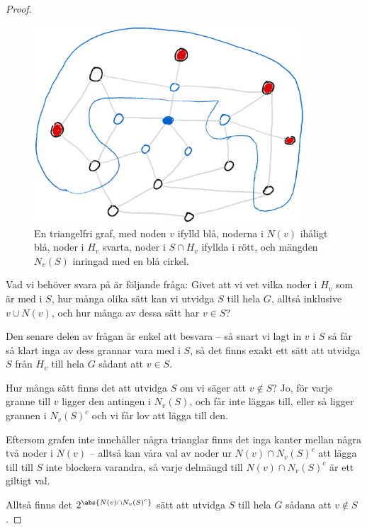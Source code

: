 \documentclass[nobib]{tufte-handout}
\begin{document}
\begin{lemma}
\begin{proof}
    \begin{figure}
      \centering
      \includegraphics[width=0.9\textwidth]{graphics/independent_sets_in_triangle_free_graphs.png}
      \caption{En triangelfri graf, med noden $v$ ifylld blå, noderna i $N(v)$ ihåligt blå, noder i $H_v$ svarta, noder i $S \cap H_v$ ifyllda i rött, och mängden $N_v(S)$ inringad med en blå cirkel.}
      \label{fig:triangle_free_graph}
    \end{figure}

    Vad vi behöver svara på är följande fråga: Givet att vi vet vilka noder i $H_v$ som är med i $S$, hur många olika sätt kan vi utvidga $S$ till hela $G$, alltså inklusive $v \cup N(v)$, och hur många av dessa sätt har $v \in S$?

    Den senare delen av frågan är enkel att besvara -- så snart vi lagt in $v$ i $S$ så får så klart inga av dess grannar vara med i $S$, så det finns exakt ett sätt att utvidga $S$ från $H_v$ till hela $G$ sådant att $v \in S$.

    Hur många sätt finns det att utvidga $S$ om vi säger att $v \not\in S$? Jo, för varje granne till $v$ ligger den antingen i $N_v(S)$, och får inte läggas till, eller så ligger grannen i $N_v(S)^c$ och vi får lov att lägga till den. 
    
    Eftersom grafen inte innehåller några trianglar finns det inga kanter mellan några två noder i $N(v)$ -- alltså kan våra val av noder ur $N(v) \cap N_v(S)^c$ att lägga till till $S$ inte blockera varandra, så varje delmängd till $N(v) \cap N_v(S)^c$ är ett giltigt val.

    Alltså finns det $2^{\abs{N(v) \cap N_v(S)^c}}$ sätt att utvidga $S$ till hela $G$ sådana att $v \not \in S$.


\end{proof}
\end{lemma}
\end{document}
